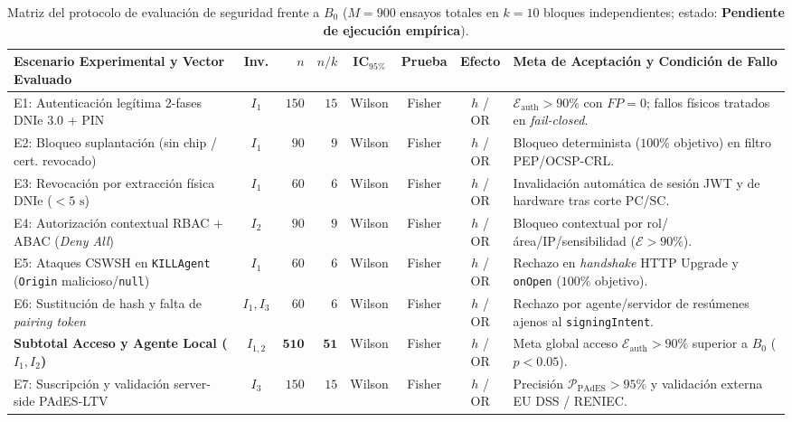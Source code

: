\documentclass[runningheads,twocolumn]{llncs}
\begin{document}
\begin{table}[t]
\caption{Matriz del protocolo de evaluación de seguridad frente a $B_0$ ($M = 900$ ensayos totales en $k = 10$ bloques independientes; estado: \textbf{Pendiente de ejecución empírica}).}
\label{tab:security_protocol}
\scriptsize
\setlength{\tabcolsep}{2.4pt}
\renewcommand{\arraystretch}{1.10}
\begin{tabularx}{\textwidth}{@{}>{\raggedright\arraybackslash}p{3.95cm}crrccc>{\raggedright\arraybackslash}X@{}}
\toprule
\textbf{Escenario Experimental y Vector Evaluado} & \textbf{Inv.} & \textbf{$n$} & \textbf{$n/k$} & \textbf{IC$_{95\%}$} & \textbf{Prueba} & \textbf{Efecto} & \textbf{Meta de Aceptación y Condición de Fallo} \\
\midrule
E1: Autenticación legítima 2-fases DNIe 3.0 + PIN & $I_1$ & $150$ & $15$ & Wilson & Fisher & $h$ / OR & $\mathcal{E}_{\text{auth}} > 90\%$ con $FP = 0$; fallos físicos tratados en \textit{fail-closed}. \\
E2: Bloqueo suplantación (sin chip / cert. revocado) & $I_1$ & $90$ & $9$ & Wilson & Fisher & $h$ / OR & Bloqueo determinista ($100\%$ objetivo) en filtro PEP/OCSP-CRL. \\
E3: Revocación por extracción física DNIe ($<5\text{ s}$) & $I_1$ & $60$ & $6$ & Wilson & Fisher & $h$ / OR & Invalidación automática de sesión JWT y de hardware tras corte PC/SC. \\
E4: Autorización contextual RBAC + ABAC (\textit{Deny All}) & $I_2$ & $90$ & $9$ & Wilson & Fisher & $h$ / OR & Bloqueo contextual por rol/área/IP/sensibilidad ($\mathcal{E} > 90\%$). \\
E5: Ataques CSWSH en \texttt{KILLAgent} (\texttt{Origin} malicioso/\texttt{null}) & $I_1$ & $60$ & $6$ & Wilson & Fisher & $h$ / OR & Rechazo en \textit{handshake} HTTP Upgrade y \texttt{onOpen} ($100\%$ objetivo). \\
E6: Sustitución de hash y falta de \textit{pairing token} & $I_1, I_3$ & $60$ & $6$ & Wilson & Fisher & $h$ / OR & Rechazo por agente/servidor de resúmenes ajenos al \texttt{signingIntent}. \\
\textbf{Subtotal Acceso y Agente Local ($I_1, I_2$)} & $I_{1,2}$ & $\mathbf{510}$ & $\mathbf{51}$ & Wilson & Fisher & $h$ / OR & Meta global acceso $\mathcal{E}_{\text{auth}} > 90\%$ superior a $B_0$ ($p < 0.05$). \\
\midrule
E7: Suscripción y validación server-side PAdES-LTV & $I_3$ & $150$ & $15$ & Wilson & Fisher & $h$ / OR & Precisión $\mathcal{P}_{\text{PAdES}} > 95\%$ y validación externa EU DSS / RENIEC. \\

\end{tabularx}
\end{table}
\end{document}
